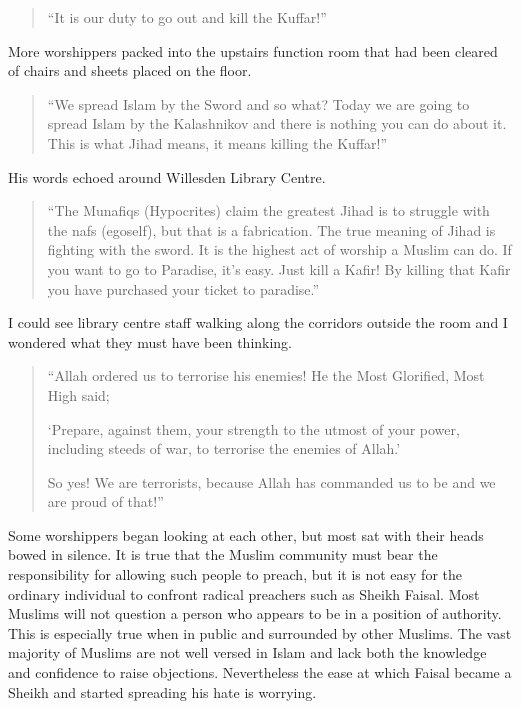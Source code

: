 \documentclass[12pt]{memoir}
\begin{document}
\begin{quote}
“It is our duty to go out and kill the Kuffar!”
\end{quote}

More worshippers packed into the upstairs function room
that had been cleared of chairs and sheets placed on the floor.

\begin{quote}
“We spread Islam by the Sword and so what? Today we are going to spread
Islam by the Kalashnikov and there is nothing you can do about it.
This is what Jihad means, it means killing the Kuffar!”
\end{quote}

His words echoed around Willesden Library Centre.

\begin{quote}
“The Munafiqs (Hypocrites) claim the greatest Jihad is to struggle
with the nafs (ego\/self), but that is a fabrication.
The true meaning of Jihad is fighting with the sword.
It is the highest act of worship a Muslim can do.
If you want to go to Paradise, it’s easy.
Just kill a Kafir!
By killing that Kafir you have purchased your ticket to paradise.”
\end{quote}

I could see library centre staff walking along the corridors outside the room
and I wondered what they must have been thinking.

\begin{quote}
“Allah ordered us to terrorise his enemies!
He the Most Glorified, Most High said;

‘Prepare, against them, your strength to the utmost of your power,
including steeds of war, to terrorise the enemies of Allah.’

So yes! We are terrorists, because Allah has commanded us
to be and we are proud of that!”
\end{quote}

Some worshippers began looking at each other,
but most sat with their heads bowed in silence.
It is true that the Muslim community must bear the responsibility
for allowing such people to preach,
but it is not easy for the ordinary individual
to confront radical preachers such as Sheikh Faisal.
Most Muslims will not question a person
who appears to be in a position of authority.
This is especially true when in public and surrounded by other Muslims.
The vast majority of Muslims are not well versed in Islam
and lack both the knowledge and confidence to raise objections.
Nevertheless the ease at which Faisal became a Sheikh
and started spreading his hate is worrying.
\end{document}
